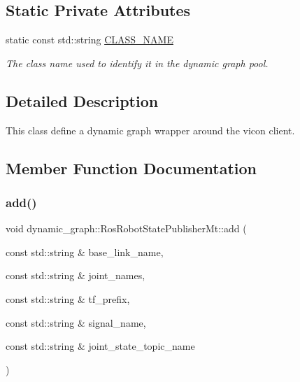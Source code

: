 \subsection*{Static Private Attributes}
\begin{DoxyCompactItemize}
\item 
\mbox{\label{classdynamic__graph_1_1RosRobotStatePublisherMt_a7e67abeab5368f985fe433896bfc83ab}} 
static const std\+::string \hyperlink{classdynamic__graph_1_1RosRobotStatePublisherMt_a7e67abeab5368f985fe433896bfc83ab}{C\+L\+A\+S\+S\+\_\+\+N\+A\+ME}
\begin{DoxyCompactList}\small\item\em The class name used to identify it in the dynamic graph pool. \end{DoxyCompactList}\end{DoxyCompactItemize}


\subsection{Detailed Description}
This class define a dynamic graph wrapper around the vicon client. 

\subsection{Member Function Documentation}
\mbox{\label{classdynamic__graph_1_1RosRobotStatePublisherMt_a2a3280fbd7d9f71c76481830ad71593c}} 
\subsubsection{\texorpdfstring{add()}{add()}}
{\footnotesize\ttfamily void dynamic\+\_\+graph\+::\+Ros\+Robot\+State\+Publisher\+Mt\+::add (\begin{DoxyParamCaption}\item[{const std\+::string \&}]{base\+\_\+link\+\_\+name,  }\item[{const std\+::string \&}]{joint\+\_\+names,  }\item[{const std\+::string \&}]{tf\+\_\+prefix,  }\item[{const std\+::string \&}]{signal\+\_\+name,  }\item[{const std\+::string \&}]{joint\+\_\+state\+\_\+topic\+\_\+name }\end{DoxyParamCaption})}


